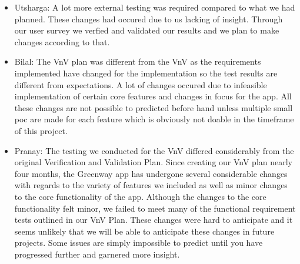 \documentclass[12pt, titlepage]{article}
\begin{document}
\begin{itemize}
\item Utsharga: A lot more external testing was required compared to what we had planned. These changes had occured due to us lacking of insight. Through our user survey we verfied and validated our results and we plan to make changes according to that.
\item Bilal: The VnV plan was different from the VnV as the requirements implemented have changed for the implementation so the test results are 
different from expectations. A lot of changes occured due to infeasible implementation of certain core features and changes in focus for the app. 
All these changes are not possible to predicted before hand unless multiple small poc are made for each feature which is obviously not doable in 
the timeframe of this project.
\item Pranay: The testing we conducted for the VnV differed considerably from the original Verification and Validation Plan. Since creating our VnV plan nearly four months, the Greenway app has undergone several considerable changes with regards to the variety of features we included as well as minor changes to the core functionality of the app. Although the changes to the core functionality felt minor, we failed to meet many of the functional requirement tests outlined in our VnV Plan. These changes were hard to anticipate and it seems unlikely that we will be able to anticipate these changes in future projects. Some issues are simply impossible to predict until you have progressed further and garnered more insight. 
\end{itemize}
\end{document}
